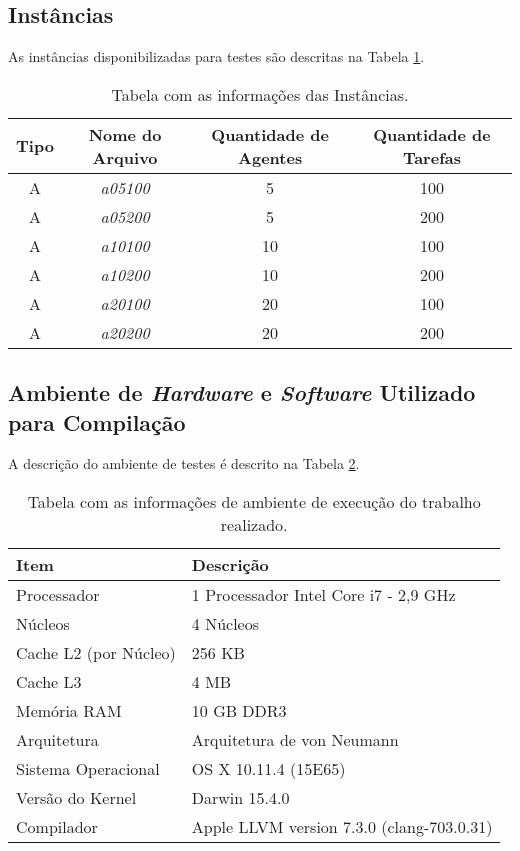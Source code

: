 \documentclass[12pt]{article}
\begin{document}
	\subsection{Instâncias}
		As instâncias disponibilizadas para testes são descritas na Tabela \ref{tab:inst}.

		\begin{table}[H]
			\centering
			\caption{Tabela com as informações das Instâncias.} \label{tab:inst}
			\begin{tabular}{cc|cc}
				\hline
				\textbf{Tipo} & \textbf{Nome do Arquivo} & \textbf{Quantidade de Agentes} & \textbf{Quantidade de Tarefas} \\ \hline \hline
				A & \textit{a05100} & 5   & 100 \\
				A & \textit{a05200} & 5   & 200 \\
				A & \textit{a10100} & 10  & 100 \\
				A & \textit{a10200} & 10  & 200 \\
				A & \textit{a20100} & 20  & 100 \\
				A & \textit{a20200} & 20  & 200 \\ \hline
			\end{tabular}
		\end{table}


	\subsection{Ambiente de \textit{Hardware} e \textit{Software} Utilizado para Compilação}

	A descrição do ambiente de testes é descrito na Tabela \ref{tab:arq}.

	\begin{table}[H]
		\caption{Tabela com as informações de ambiente de execução do trabalho realizado.}
		\centering \label{tab:arq}
		\begin{tabular}{l|l}
			\hline
			\textbf{Item}                & \textbf{Descrição} \\ \hline \hline
			Processador         & 1 Processador Intel Core i7 - 2,9 GHz         \\
			Núcleos             & 4 Núcleos \\
			Cache L2 (por Núcleo) & 256 KB \\
			Cache L3            & 4 MB \\
			Memória RAM         & 10 GB DDR3        \\
			Arquitetura         & Arquitetura de von Neumann         \\
			Sistema Operacional & OS X 10.11.4 (15E65)         \\
			Versão do Kernel    & Darwin 15.4.0 \\
			Compilador          & Apple LLVM version 7.3.0 (clang-703.0.31)         \\\hline
		\end{tabular}
	\end{table}
\end{document}
